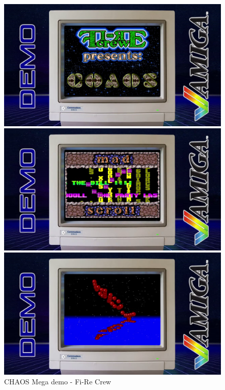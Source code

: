 \begin{figure}[h]
  \begin{minipage}[b]{0.30\linewidth}
    \centering
    \includegraphics[width=\linewidth]{images/demoscene/demos/chaos1.png}
  \end{minipage}
  \hfill
  \begin{minipage}[b]{0.30\linewidth}
    \centering
    \includegraphics[width=\linewidth]{images/demoscene/demos/chaos2.png}
  \end{minipage}
  \hfill
  \begin{minipage}[b]{0.30\linewidth}
    \centering
    \includegraphics[width=\linewidth]{images/demoscene/demos/chaos3.png}
  \end{minipage}
  \caption{CHAOS Mega demo - Fi-Re Crew}
  \label{chaos2}
\end{figure}


